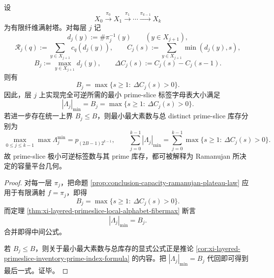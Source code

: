 \begin{theorem}\label{thm:conclusion-primeslice-minimal-alphabet-ramanujan-plateau}
设
\[
X_0\xrightarrow{\pi_0}X_1\xrightarrow{\pi_1}\cdots\xrightarrow{\pi_{k-1}}X_k
\]
为有限纤维满射塔。对每层 \(j\) 记
\[
d_j(y):=\#\pi_j^{-1}(y)
\qquad(y\in X_{j+1}),
\]
\[
\mathscr R_j(q):=\sum_{y\in X_{j+1}}c_q(d_j(y)),
\qquad
C_j(s):=\sum_{y\in X_{j+1}}\min(d_j(y),s),
\]
\[
B_j:=\max_{y\in X_{j+1}}d_j(y),
\qquad
\Delta C_j(s):=C_j(s)-C_j(s-1).
\]
则有
\[
B_j=\max\{s\ge 1:\ \Delta C_j(s)>0\}.
\]
因此，层 \(j\) 上实现完全可逆所需的最小 prime-slice 标签字母表大小满足
\[
|\Lambda_j|_{\min}=B_j=\max\{s\ge 1:\ \Delta C_j(s)>0\}.
\]
若进一步存在统一上界 \(B_j\le B\)，则最小最大素数与总 distinct prime-slice 库存分别为
\[
\max_{0\le j\le k-1}\max \Lambda_j^{\min}=p_{(2B-1)2^{k-1}},
\qquad
\sum_{j=0}^{k-1}|\Lambda_j|_{\min}
=
\sum_{j=0}^{k-1}\max\{s\ge 1:\ \Delta C_j(s)>0\}.
\]
故 prime-slice 极小可逆标签数与其 prime 库存，都可被解释为 Ramanujan 所决定的容量平台几何。
\end{theorem}

\begin{proof}
对每一层 \(\pi_j\)，把命题 \ref{prop:conclusion-capacity-ramanujan-plateau-law} 应用于有限满射 \(f=\pi_j\)，即得
\[
B_j=\max\{s\ge 1:\ \Delta C_j(s)>0\}.
\]
而定理 \ref{thm:xi-layered-primeslice-local-alphabet-fibermax} 断言
\[
|\Lambda_j|_{\min}=B_j.
\]
合并即得中间公式。

若 \(B_j\le B\)，则关于最小最大素数与总库存的显式公式正是推论 \ref{cor:xi-layered-primeslice-inventory-prime-index-formula} 的内容。把 \(|\Lambda_j|_{\min}=B_j\) 代回即可得到最后一式。证毕。
\end{proof}

